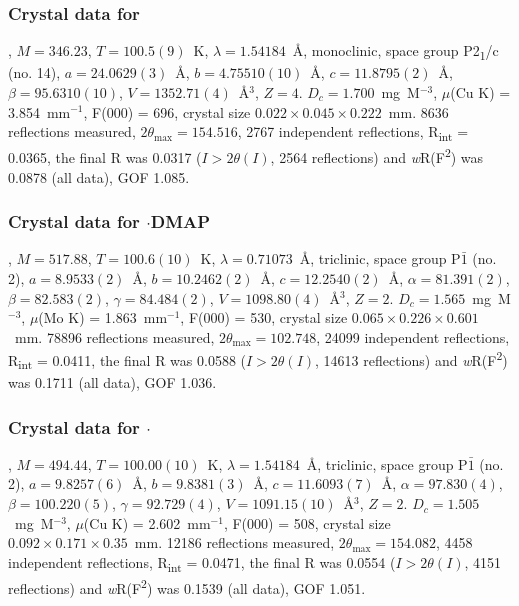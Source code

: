 \begin{refsection}
\subsubsection{Crystal data for \texorpdfstring{}{C16 H13 N O3 Se}}
, $M=346.23$, $T=100.5(9)$~K, $\lambda=1.54184$~\AA, monoclinic, space group P2\textsubscript{1}/c (no. 14), $a = 24.0629(3)$~\AA, $b = 4.75510(10)$~\AA, $c = 11.8795(2)$~\AA, $\beta = 95.6310(10)$\degree, $V = 1352.71(4)$~\AA$^{3}$, $Z = 4$. $D_{c}= 1.700$~mg~M$^{-3}$, $\mu$(Cu K\a) = 3.854~mm$^{-1}$, F(000) = 696, crystal size $0.022 \times 0.045 \times 0.222$~mm. 8636 reflections measured, $2\theta_{\mathrm{max}}=154.516$\degree, 2767 independent reflections, R\textsubscript{int} = 0.0365, the final R was 0.0317 ($I > 2\theta(I)$, 2564 reflections) and \emph{w}R(F\textsuperscript{2}) was 0.0878 (all data), GOF 1.085.

\subsubsection{Crystal data for \texorpdfstring{$\cdot$DMAP}{C24 H25 Cl N3 O3 Se}}
, $M=517.88$, $T=100.6(10)$~K, $\lambda=0.71073$~\AA, triclinic, space group P$\bar{1}$ (no. 2), $a = 8.9533(2)$~\AA, $b = 10.2462(2)$~\AA, $c = 12.2540(2)$~\AA, $\alpha = 81.391(2)$\degree, $\beta = 82.583(2)$\degree, $\gamma = 84.484(2)$\degree, $V = 1098.80(4)$~\AA$^{3}$, $Z = 2$. $D_{c}= 1.565$~mg~M$^{-3}$, $\mu$(Mo K\a) = 1.863~mm$^{-1}$, F(000) = 530, crystal size $0.065 \times 0.226 \times 0.601$~mm. 78896 reflections measured, $2\theta_{\mathrm{max}}=102.748$\degree, 24099 independent reflections, R\textsubscript{int} = 0.0411, the final R was 0.0588 ($I > 2\theta(I)$, 14613 reflections) and \emph{w}R(F\textsuperscript{2}) was 0.1711 (all data), GOF 1.036.

\subsubsection{Crystal data for \texorpdfstring{$\cdot$}{C25 H25 N3 O3 Se}}
, $M=494.44$, $T=100.00(10)$~K, $\lambda=1.54184$~\AA, triclinic, space group P$\bar{1}$ (no. 2), $a = 9.8257(6)$~\AA, $b = 9.8381(3)$~\AA, $c = 11.6093(7)$~\AA, $\alpha = 97.830(4)$\degree, $\beta = 100.220(5)$\degree, $\gamma = 92.729(4)$\degree, $V = 1091.15(10)$~\AA$^{3}$, $Z = 2$. $D_{c}= 1.505$~mg~M$^{-3}$, $\mu$(Cu K\a) = 2.602~mm$^{-1}$, F(000) = 508, crystal size $0.092 \times 0.171 \times 0.35$~mm. 12186 reflections measured, $2\theta_{\mathrm{max}}=154.082$\degree, 4458 independent reflections, R\textsubscript{int} = 0.0471, the final R was 0.0554 ($I > 2\theta(I)$, 4151 reflections) and \emph{w}R(F\textsuperscript{2}) was 0.1539 (all data), GOF 1.051.


\end{refsection}
